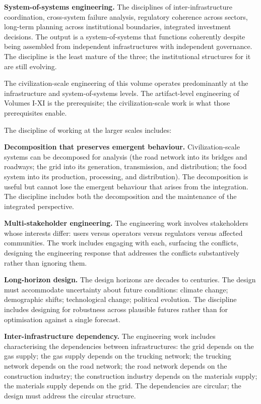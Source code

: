 \textbf{System-of-systems engineering.} The disciplines of inter-infrastructure coordination, cross-system failure analysis, regulatory coherence across sectors, long-term planning across institutional boundaries, integrated investment decisions. The output is a system-of-systems that functions coherently despite being assembled from independent infrastructures with independent governance. The discipline is the least mature of the three; the institutional structures for it are still evolving.

The civilization-scale engineering of this volume operates predominantly at the infrastructure and system-of-systems levels. The artifact-level engineering of Volumes I-XI is the prerequisite; the civilization-scale work is what those prerequisites enable.

The discipline of working at the larger scales includes:

\textbf{Decomposition that preserves emergent behaviour.} Civilization-scale systems can be decomposed for analysis (the road network into its bridges and roadways; the grid into its generation, transmission, and distribution; the food system into its production, processing, and distribution). The decomposition is useful but cannot lose the emergent behaviour that arises from the integration. The discipline includes both the decomposition and the maintenance of the integrated perspective.

\textbf{Multi-stakeholder engineering.} The engineering work involves stakeholders whose interests differ: users versus operators versus regulators versus affected communities. The work includes engaging with each, surfacing the conflicts, designing the engineering response that addresses the conflicts substantively rather than ignoring them.

\textbf{Long-horizon design.} The design horizons are decades to centuries. The design must accommodate uncertainty about future conditions: climate change; demographic shifts; technological change; political evolution. The discipline includes designing for robustness across plausible futures rather than for optimisation against a single forecast.

\textbf{Inter-infrastructure dependency.} The engineering work includes characterising the dependencies between infrastructures: the grid depends on the gas supply; the gas supply depends on the trucking network; the trucking network depends on the road network; the road network depends on the construction industry; the construction industry depends on the materials supply; the materials supply depends on the grid. The dependencies are circular; the design must address the circular structure.

